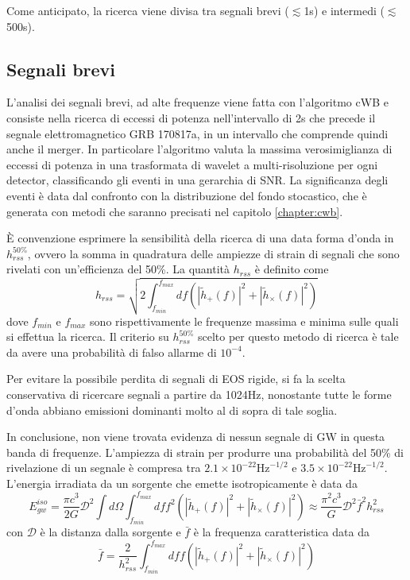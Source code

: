 Come anticipato, la ricerca viene divisa tra segnali brevi ($\lesssim$1s) e intermedi ($\lesssim$500s).
\subsection{Segnali brevi}
L'analisi dei segnali brevi, ad alte frequenze viene fatta con l'algoritmo cWB e consiste nella ricerca di eccessi di potenza nell'intervallo di 2s che precede il segnale elettromagnetico GRB 170817a, in un intervallo che comprende quindi anche il merger.
In particolare l'algoritmo valuta la massima verosimiglianza di eccessi di potenza in una trasformata di wavelet a multi-risoluzione per ogni detector, classificando gli eventi in una gerarchia di SNR. La significanza degli eventi è data dal confronto con la distribuzione del fondo stocastico, che è generata con metodi che saranno precisati nel capitolo \ref{chapter:cwb}. 

È convenzione esprimere la sensibilità della ricerca di una data forma d'onda in $h_{rss}^{50\%}$, ovvero la somma in quadratura delle ampiezze di strain di segnali che sono rivelati con un'efficienza del 50\%. La quantità $h_{rss}$ è definito come
\begin{equation}
	h_{rss} = \sqrt{2\int_{f_{min}}^{f_{max}}df(|\tilde{h}_+(f)|^2 + |\tilde{h}_\times(f)|^2 )}
\end{equation}
dove $f_{min}$ e $f_{max}$ sono rispettivamente le frequenze massima e minima sulle quali si effettua la ricerca. 
Il criterio su $h_{rss}^{50\%}$ scelto per questo metodo di ricerca è tale da avere una probabilità di falso allarme di $10^{-4}$.

Per evitare la possibile perdita di segnali di EOS rigide, si fa la scelta conservativa di ricercare segnali a partire da 1024Hz, nonostante tutte le forme d'onda abbiano emissioni dominanti molto al di sopra di tale soglia.

In conclusione, non viene trovata evidenza di nessun segnale di GW in questa banda di frequenze.
L'ampiezza di strain per produrre una probabilità del 50\% di rivelazione di un segnale è compresa tra $2.1 \times 10^{-22} \text{Hz}^{-1/2}$ e $3.5 \times 10^{-22} \text{Hz}^{-1/2}$. L'energia irradiata da un sorgente che emette isotropicamente è data da 
\begin{equation}
	E_{gw}^{iso} = \frac{\pi c^3}{2G}\mathcal{D}^2\int d\Omega \int_{f_{min}}^{f_{max}}dff^2(|\tilde{h}_+(f)|^2 + |\tilde{h}_\times(f)|^2 ) \approx \frac{\pi^2 c^3}{G}\mathcal{D}^2\bar{f}^2h_{rss}^2
\end{equation}
con $\mathcal{D}$ è la distanza dalla sorgente e $\bar{f}$ è la frequenza caratteristica data da 
\begin{equation}
	\bar{f} = \frac{2}{h_{rss}^2}\int_{f_{min}}^{f_{max}}dff(|\tilde{h}_+(f)|^2 + |\tilde{h}_\times(f)|^2 )
\end{equation}

